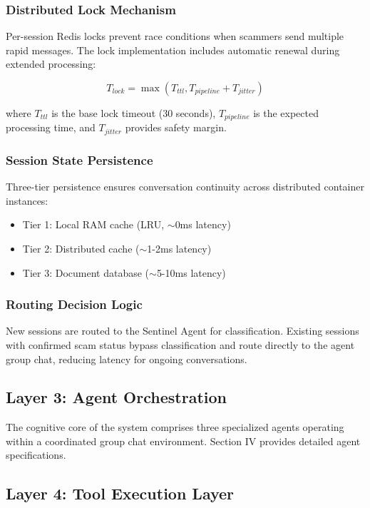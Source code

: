 \documentclass[conference]{IEEEtran}
\begin{document}
\subsubsection{Distributed Lock Mechanism}
Per-session Redis locks prevent race conditions when scammers send multiple rapid messages. The lock implementation includes automatic renewal during extended processing:

\begin{equation}
T_{lock} = \max(T_{ttl}, T_{pipeline} + T_{jitter})
\end{equation}

where $T_{ttl}$ is the base lock timeout (30 seconds), $T_{pipeline}$ is the expected processing time, and $T_{jitter}$ provides safety margin.

\subsubsection{Session State Persistence}
Three-tier persistence ensures conversation continuity across distributed container instances:
\begin{itemize}
    \item Tier 1: Local RAM cache (LRU, $\sim$0ms latency)
    \item Tier 2: Distributed cache ($\sim$1-2ms latency)
    \item Tier 3: Document database ($\sim$5-10ms latency)
\end{itemize}

\subsubsection{Routing Decision Logic}
New sessions are routed to the Sentinel Agent for classification. Existing sessions with confirmed scam status bypass classification and route directly to the agent group chat, reducing latency for ongoing conversations.

\subsection{Layer 3: Agent Orchestration}

The cognitive core of the system comprises three specialized agents operating within a coordinated group chat environment. Section IV provides detailed agent specifications.

\subsection{Layer 4: Tool Execution Layer}
\end{document}
